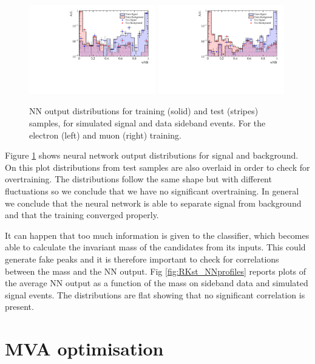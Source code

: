 \begin{figure}
\centering
\includegraphics[width=0.49\textwidth]{RKst/figs/Training/EE_wNB_TrainAndTest.pdf}
\includegraphics[width=0.49\textwidth]{RKst/figs/Training/MM_wNB_TrainAndTest.pdf}
\caption{NN output distributions for training (solid) and test (stripes) samples, for simulated 
signal and data sideband events. For the electron (left) and muon (right) training.}
\label{fig:RKst_nnDist}
\end{figure}

Figure \ref{fig:RKst_nnDist} shows neural network output distributions for signal and background.
On this plot distributions from test samples are also overlaid in order to check for overtraining. 
The distributions follow the same shape but with different fluctuations so we conclude that we have no
significant overtraining. In general we conclude that the neural network is able to separate signal
from background and that the training converged properly.

It can happen that too much information is given to the classifier, which becomes able to 
calculate the invariant mass of the candidates from its inputs. This could generate fake peaks and it is therefore
important to check for correlations between the \Bz mass and the NN output.  Fig \ref{fig:RKst_NNprofiles} reports
plots of the average NN output as a function of the \Bz mass on sideband data and simulated signal events.
The distributions are flat showing that no significant correlation is present.


\section{MVA optimisation}

